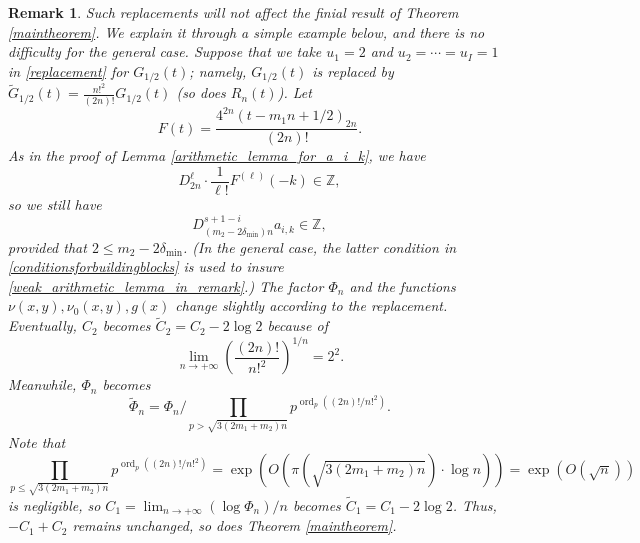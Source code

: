\documentclass[11pt]{amsart}
\newtheorem{remark}[theorem]{Remark}
\numberwithin{equation}{section}
\begin{document}
\begin{remark}
Such replacements will not affect the finial result of Theorem \ref{maintheorem}. We explain it through a simple example below, and there is no difficulty for the general case. Suppose that we take $u_1=2$ and $u_2=\cdots=u_{I}=1$ in \eqref{replacement} for $G_{1/2}(t)$; namely, $G_{1/2}(t)$ is replaced by $\widetilde{G}_{1/2}(t) = \frac{n!^2}{(2n)!}G_{1/2}(t)$ (so does $R_n(t)$).
Let
\[ F(t) = \frac{4^{2n}(t-m_{1}n+1/2)_{2n}}{(2n)!}.  \]
As in the proof of Lemma \ref{arithmetic_lemma_for_a_i_k}, we have
\[ D_{2n}^{\ell} \cdot \frac{1}{\ell!} F^{(\ell)}(-k) \in \mathbb{Z}, \]
so we still have  
\begin{equation}\label{weak_arithmetic_lemma_in_remark}
D_{(m_2-2\delta_{\min})n}^{s+1-i} a_{i,k} \in \mathbb{Z},
\end{equation}
provided that $2 \leqslant m_2-2\delta_{\min}$. (In the general case, the latter condition in \eqref{conditionsforbuildingblocks} is used to insure \eqref{weak_arithmetic_lemma_in_remark}.) The factor $\Phi_n$ and the functions $\nu(x,y),\nu_0(x,y),g(x)$ change slightly according to the replacement. Eventually, $C_2$ becomes $\widetilde{C}_2 = C_{2} - 2\log 2$ because of
\[ \lim_{n \rightarrow +\infty} \left( \frac{(2n)!}{n!^2} \right)^{1/n} = 2^2. \]
Meanwhile, $\Phi_n$ becomes
\[ \widetilde{\Phi}_n = \Phi_n \Bigg/ \prod_{p > \sqrt{3(2m_1+m_2)n}} p^{\operatorname{ord}_{p}((2n)!/n!^2)}.\]
Note that 
\[ \prod_{p \leqslant \sqrt{3(2m_1+m_2)n}} p^{\operatorname{ord}_{p}((2n)!/n!^2)} = \exp\left( O(\pi(\sqrt{3(2m_1+m_2)n}) \cdot \log n) \right)= \exp(O(\sqrt{n}))  \]
is negligible, so $C_1 = \lim_{n \rightarrow +\infty} (\log \Phi_n)/n$ becomes $\widetilde{C}_1 = C_1 - 2\log 2$. Thus, $-C_1+C_2$ remains unchanged, so does Theorem \ref{maintheorem}.



\end{remark}
\end{document}
